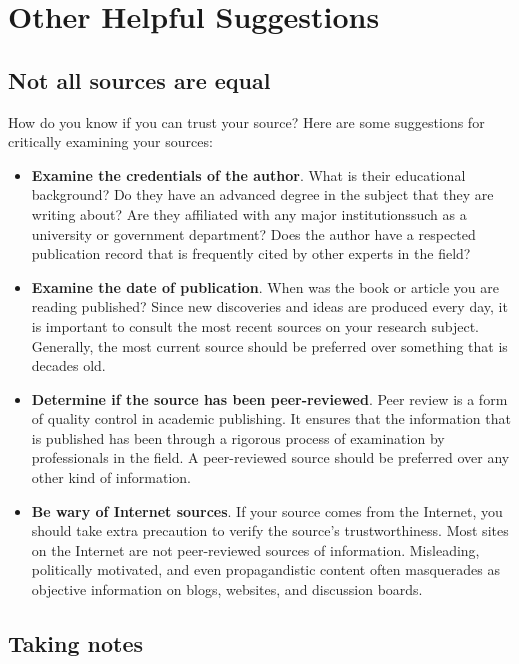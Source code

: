 \documentclass[book]{memoir}
\begin{document}
\section{Other Helpful Suggestions}

\subsection{Not all sources are equal}

How do you know if you can trust your source? Here are some suggestions for critically examining your sources:

\begin{itemize}
\item \textbf{Examine the credentials of the author}. What is their educational background? Do they have an advanced degree in the subject that they are writing about? Are they affiliated with any major institutions\textemdash such as a university or government department? Does the author have a respected publication record that is frequently cited by other experts in the field?

\item \textbf{Examine the date of publication}. When was the book or article you are reading published? Since new discoveries and ideas are produced every day, it is important to consult the most recent sources on your research subject. Generally, the most current source should be preferred over something that is decades old.

\item \textbf{Determine if the source has been peer-reviewed}. Peer review is a form of quality control in academic publishing. It ensures that the information that is published has been through a rigorous process of examination by professionals in the field. A peer-reviewed source should be preferred over any other kind of information.

\item \textbf{Be wary of Internet sources}. If your source comes from the Internet, you should take extra precaution to verify the source's trustworthiness. Most sites on the Internet are not peer-reviewed sources of information. Misleading, politically motivated, and even propagandistic content often masquerades as objective information on blogs, websites, and discussion boards. 
\end{itemize}

\subsection{Taking notes}
\end{document}
